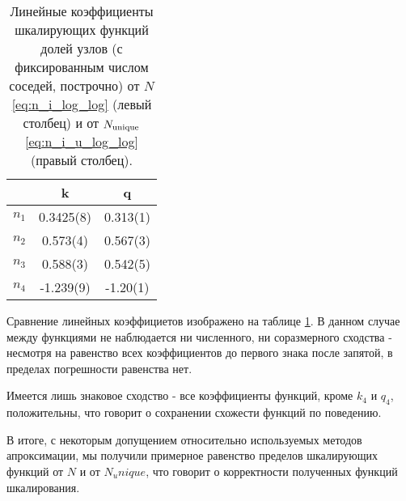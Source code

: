 \begin{table}[h]
\centering
\begin{tabular}{|c|c|c|}
\hline
 & k & q \\ \hline
$n_1$ & 0.3425(8) &  0.313(1) \\ \hline
$n_2$ & 0.573(4) & 0.567(3) \\ \hline
$n_3$ & 0.588(3) & 0.542(5) \\ \hline
$n_4$ & -1.239(9) & -1.20(1) \\ \hline
\end{tabular}
\caption{Линейные коэффициенты шкалирующих функций долей узлов (с фиксированным числом соседей, построчно) от $N$ \eqref{eq:n_i_log_log} (левый столбец) и от $N_{\textup{unique}}$ \eqref{eq:n_i_u_log_log} (правый столбец).}
\label{tab:kq_compare}
\end{table}

Сравнение линейных коэффициетов изображено на таблице \ref{tab:kq_compare}. 
В данном случае между функциями не наблюдается ни численного, ни соразмерного сходства - несмотря на равенство всех коэффициентов до первого знака после запятой, в пределах погрешности равенства нет.

Имеется лишь знаковое сходство - все коэффициенты функций, кроме $k_4$ и $q_4$, положительны, что говорит о сохранении схожести функций по поведению.

В итоге, с некоторым допущением относительно используемых методов апроксимации, мы получили примерное равенство пределов шкалирующих функций от $N$ и от $N_unique$, что говорит о корректности полученных функций шкалирования.


\newpage
